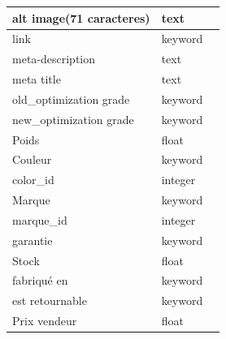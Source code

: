 \begin{longtable}{|l|l|p{5cm}|}
	alt image(71 caracteres)                     & text                    &                                            \\ \hline
	link                                         & keyword                 &                                            \\ \hline
	meta-description                             & text                    &                                            \\ \hline
	meta title                                   & text                    &                                            \\ \hline
	old\_optimization grade                      & keyword                 &                                            \\ \hline
	new\_optimization grade                      & keyword                 &                                            \\ \hline
	Poids                                        & float                   &                                            \\ \hline
	Couleur                                      & keyword                 &                                            \\ \hline
	color\_id                                    & integer                 &                                            \\
	\hline
	Marque                                       & keyword                 &                                            \\ \hline
	marque\_id                                   & integer                 &                                            \\ \hline
	garantie                                     & keyword                 &                                            \\ \hline
	Stock                                        & float                   &                                            \\ \hline
	fabriqué en                                  & keyword                 &                                            \\ \hline
	est retournable                              & keyword                 &                                            \\ \hline
	Prix vendeur                                 & float                   &                                            \\ \hline

\end{longtable}
